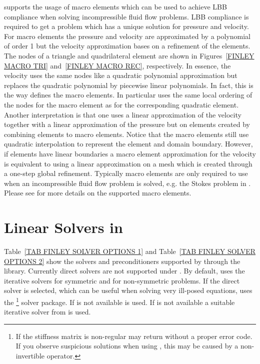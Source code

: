 \finley supports the usage of macro elements which can be
used to achieve LBB compliance when solving incompressible fluid flow problems.
LBB compliance is required to get a problem which has a unique solution for
pressure and velocity. For macro elements the pressure and velocity are
approximated by a polynomial of order 1 but the velocity approximation bases on
a refinement of the elements. The nodes of a triangle and quadrilateral element
are shown in Figures~\ref{FINLEY MACRO TRI} and~\ref{FINLEY MACRO REC},
respectively. In essence, the velocity uses the same nodes like a quadratic
polynomial approximation but replaces the quadratic polynomial by piecewise
linear polynomials. In fact, this is the way \finley defines the macro elements.
In particular \finley uses the same local ordering of the nodes for the macro
element as for the corresponding quadratic element. Another interpretation is
that one uses a linear approximation of the velocity together with a linear
approximation of the pressure but on elements created by combining elements to
macro elements. Notice that the macro elements still use quadratic
interpolation to represent the element and domain boundary.
However, if elements have linear boundaries a macro element approximation for
the velocity is equivalent to using a linear approximation on a mesh which is
created through a one-step global refinement.
Typically macro elements are only required to use when an incompressible fluid
flow problem is solved, e.g. the Stokes problem in .
Please see  for more details on the supported macro elements.

\section{Linear Solvers in \SolverOptions}

Table~\ref{TAB FINLEY SOLVER OPTIONS 1} and
Table~\ref{TAB FINLEY SOLVER OPTIONS 2} show the solvers and preconditioners
supported by \finley through the \PASO library.
Currently direct solvers are not supported under \MPI.
By default, \finley uses the iterative solvers \PCG for symmetric and \BiCGStab
for non-symmetric problems.
If the direct solver is selected, which can be useful when solving very
ill-posed equations, \finley uses the \MKL\footnote{If the stiffness matrix is
non-regular \MKL may return without a proper error code. If you observe
suspicious solutions when using \MKL, this may be caused by a non-invertible
operator.} solver package. If \MKL is not available \UMFPACK is used.
If \UMFPACK is not available a suitable iterative solver from \PASO is used.

